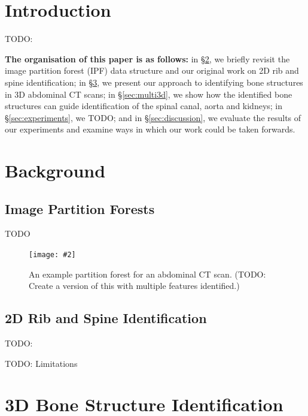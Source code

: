 \documentclass[10pt,twocolumn,twoside]{IEEEtran}
\newcommand{\stufigex}[5]					%
{
	\begin{figure}[#5]
	\begin{center}
		\texttt{[image: \#2]}
		\caption{#3}
		\label{#4}
	\end{center}
	\end{figure}
}
\begin{document}
\IEEEpeerreviewmaketitle

\section{Introduction}

TODO: \cite{campadelli09,chu13,li13,linguraru12,okada12,park03,shimizu07,suzuki12,zhou07}

\textbf{The organisation of this paper is as follows:} in \S\ref{sec:background}, we briefly revisit the image partition forest (IPF) data structure and our original work on 2D rib and spine identification; in \S\ref{sec:bone3d}, we present our approach to identifying bone structures in 3D abdominal CT scans; in \S\ref{sec:multi3d}, we show how the identified bone structures can guide identification of the spinal canal, aorta and kidneys; in \S\ref{sec:experiments}, we TODO; and in \S\ref{sec:discussion}, we evaluate the results of our experiments and examine ways in which our work could be taken forwards.

\section{Background}
\label{sec:background}

\subsection{Image Partition Forests}

TODO

\stufigex{width=.85\linewidth}{ipfs-ctconcept.png}{An example partition forest for an abdominal CT scan. (TODO: Create a version of this with multiple features identified.)}{fig:ipfs-ctconcept}{htb}

\subsection{2D Rib and Spine Identification}

TODO: \cite{gvccimi08,gvcispa09}

TODO: Limitations

\section{3D Bone Structure Identification}
\label{sec:bone3d}
\end{document}
